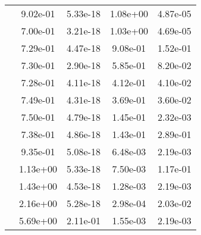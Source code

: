 \begin{table}
\begin{tabular}{c|cc|cc|}
\multicolumn{1}{|c|}{} & \multicolumn{1}{|c|}{  9.02e-01} & \multicolumn{1}{|c|}{  5.33e-18} & \multicolumn{1}{|c|}{  1.08e+00} & \multicolumn{1}{|c|}{  4.87e-05} \\ 
\multicolumn{1}{|c|}{} & \multicolumn{1}{|c|}{  7.00e-01} & \multicolumn{1}{|c|}{  3.21e-18} & \multicolumn{1}{|c|}{  1.03e+00} & \multicolumn{1}{|c|}{  4.69e-05} \\ 
\multicolumn{1}{|c|}{} & \multicolumn{1}{|c|}{  7.29e-01} & \multicolumn{1}{|c|}{  4.47e-18} & \multicolumn{1}{|c|}{  9.08e-01} & \multicolumn{1}{|c|}{  1.52e-01} \\ 
\multicolumn{1}{|c|}{} & \multicolumn{1}{|c|}{  7.30e-01} & \multicolumn{1}{|c|}{  2.90e-18} & \multicolumn{1}{|c|}{  5.85e-01} & \multicolumn{1}{|c|}{  8.20e-02} \\ 
\multicolumn{1}{|c|}{} & \multicolumn{1}{|c|}{  7.28e-01} & \multicolumn{1}{|c|}{  4.11e-18} & \multicolumn{1}{|c|}{  4.12e-01} & \multicolumn{1}{|c|}{  4.10e-02} \\ 
\multicolumn{1}{|c|}{} & \multicolumn{1}{|c|}{  7.49e-01} & \multicolumn{1}{|c|}{  4.31e-18} & \multicolumn{1}{|c|}{  3.69e-01} & \multicolumn{1}{|c|}{  3.60e-02} \\ 
\multicolumn{1}{|c|}{} & \multicolumn{1}{|c|}{  7.50e-01} & \multicolumn{1}{|c|}{  4.79e-18} & \multicolumn{1}{|c|}{  1.45e-01} & \multicolumn{1}{|c|}{  2.32e-03} \\ 
\multicolumn{1}{|c|}{} & \multicolumn{1}{|c|}{  7.38e-01} & \multicolumn{1}{|c|}{  4.86e-18} & \multicolumn{1}{|c|}{  1.43e-01} & \multicolumn{1}{|c|}{  2.89e-01} \\ 
\multicolumn{1}{|c|}{} & \multicolumn{1}{|c|}{  9.35e-01} & \multicolumn{1}{|c|}{  5.08e-18} & \multicolumn{1}{|c|}{  6.48e-03} & \multicolumn{1}{|c|}{  2.19e-03} \\ 
\multicolumn{1}{|c|}{} & \multicolumn{1}{|c|}{  1.13e+00} & \multicolumn{1}{|c|}{  5.33e-18} & \multicolumn{1}{|c|}{  7.50e-03} & \multicolumn{1}{|c|}{  1.17e-01} \\ 
\multicolumn{1}{|c|}{} & \multicolumn{1}{|c|}{  1.43e+00} & \multicolumn{1}{|c|}{  4.53e-18} & \multicolumn{1}{|c|}{  1.28e-03} & \multicolumn{1}{|c|}{  2.19e-03} \\ 
\multicolumn{1}{|c|}{} & \multicolumn{1}{|c|}{  2.16e+00} & \multicolumn{1}{|c|}{  5.28e-18} & \multicolumn{1}{|c|}{  2.98e-04} & \multicolumn{1}{|c|}{  2.03e-02} \\ 
\multicolumn{1}{|c|}{} & \multicolumn{1}{|c|}{  5.69e+00} & \multicolumn{1}{|c|}{  2.11e-01} & \multicolumn{1}{|c|}{  1.55e-03} & \multicolumn{1}{|c|}{  2.19e-03} \\ 

\end{tabular}
\end{table}
